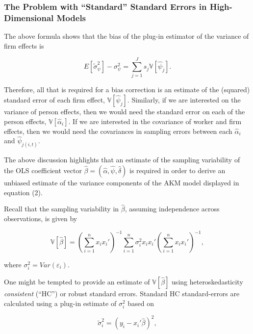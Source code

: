 \documentclass[11pt]{article}
\begin{document}
\hypertarget{the-problem-with-standard-standard-errors-in-high-dimensional-models}{%
\subsubsection{The Problem with ``Standard'' Standard Errors in High-
Dimensional
Models}\label{the-problem-with-standard-standard-errors-in-high-dimensional-models}}

The above formula shows that the bias of the plug-in estimator of the
variance of firm effects is

\begin{equation}
E[\tilde{\sigma}_{\psi}^2]-\sigma^{2}_{\psi}=\sum_{j=1}^{J}s_{j}{\mathbb{V}[\hat{\psi}_{j}]}.
\end{equation}

Therefore, all that is required for a bias correction is an estimate of
the (squared) standard error of each firm effect,
\({\mathbb{V}[\hat{\psi}_{j}]}\). Similarly, if we are interested on the
variance of person effects, then we would need the standard error on
each of the person effects, \({\mathbb{V}[\hat{\alpha}_{i}]}\). If we
are interested in the covariance of worker and firm effects, then we
would need the covariances in sampling errors between each
\(\hat{\alpha}_{i}\) and \(\hat{\psi}_{j(i,t)}\).

The above discussion highlights that an estimate of the sampling
variability of the OLS coefficient vector
\(\hat{\beta}=(\hat{\alpha},\hat{\psi},\hat{\delta})\) is required in
order to derive an unbiased estimate of the variance components of the
AKM model displayed in equation (2).

Recall that the sampling variability in \(\hat{\beta}\), assuming
independence across observations, is given by

\begin{equation}
{\mathbb{{V}}}[\hat{\beta}]=\left(\sum_{i=1}^{n}x_{i}x_{i}'\right)^{-1}\sum_{i=1}^{n}{\sigma}^{2}_{i}x_{i}x_{i}'\left(\sum_{i=1}^{n}x_{i}x_{i}'\right)^{-1},
\end{equation}

where \(\sigma^{2}_{i}=Var(\varepsilon_{i})\).

One might be tempted to provide an estimate of \(\mathbb{V}[\hat{\beta}]\)
using heteroskedasticity \emph{consistent} (``HC'') or robust standard
errors. Standard \cite{white1980heteroskedasticity} HC standard-errors are calculated using a plug-in
estimate of \(\sigma^{2}_{i}\) based on

\begin{equation}
\tilde{\sigma}^{2}_{i}=(y_{i}-x_{i}'\hat{\beta})^2,
\end{equation}
\end{document}
